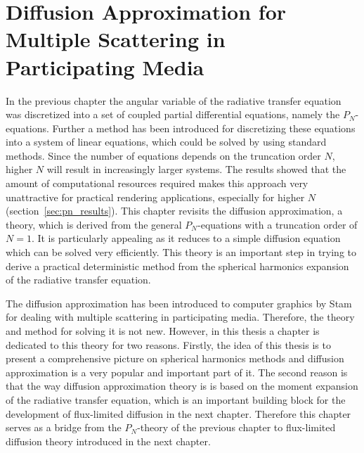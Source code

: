 \chapter[Diffusion for Multiple Scattering in Participating Media]{Diffusion Approximation for Multiple Scattering in Participating Media}
%
\label{sec:diffusion_approximation}

In the previous chapter the angular variable of the radiative transfer equation was discretized into a set of coupled partial differential equations, namely the $P_N$-equations. Further a method has been introduced for discretizing these equations into a system of linear equations, which could be solved by using standard methods. Since the number of equations depends on the truncation order $N$, higher $N$ will result in increasingly larger systems. The results showed that the amount of computational resources required makes this approach very unattractive for practical rendering applications, especially for higher $N$ (section~\ref{sec:pn_results}). This chapter revisits the diffusion approximation, a theory, which is derived from the general $P_N$-equations with a truncation order of $N=1$. It is particularly appealing as it reduces to a simple diffusion equation which can be solved very efficiently. This theory is an important step in trying to derive a practical deterministic method from the spherical harmonics expansion of the radiative transfer equation.

The diffusion approximation has been introduced to computer graphics by Stam~\cite{Stam95} for dealing with multiple scattering in participating media. Therefore, the theory and method for solving it is not new. However, in this thesis a chapter is dedicated to this theory for two reasons. Firstly, the idea of this thesis is to present a comprehensive picture on spherical harmonics methods and diffusion approximation is a very popular and important part of it. The second reason is that the way diffusion approximation theory is is based on the moment expansion of the radiative transfer equation, which is an important building block for the development of flux-limited diffusion in the next chapter. Therefore this chapter serves as a bridge from the $P_N$-theory of the previous chapter to flux-limited diffusion theory introduced in the next chapter.


